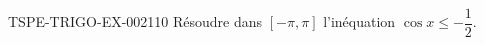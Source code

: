 \begin{exercice}{TSPE-TRIGO-EX-002}{1}{10}
Résoudre dans $[-\pi, \pi]$ l'inéquation $\cos x \leq -\dfrac{1}{2}$.
\end{exercice}
